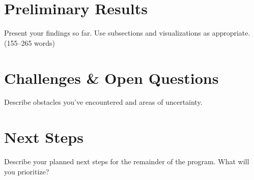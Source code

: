 \documentclass[midterm]{sparreport}
\begin{document}
\section{Preliminary Results}

Present your findings so far. Use subsections and visualizations as appropriate.(155–265 words)

\section{Challenges \& Open Questions}

Describe obstacles you've encountered and areas of uncertainty.

\section{Next Steps}

Describe your planned next steps for the remainder of the program. What will you prioritize?

%



\end{document}
